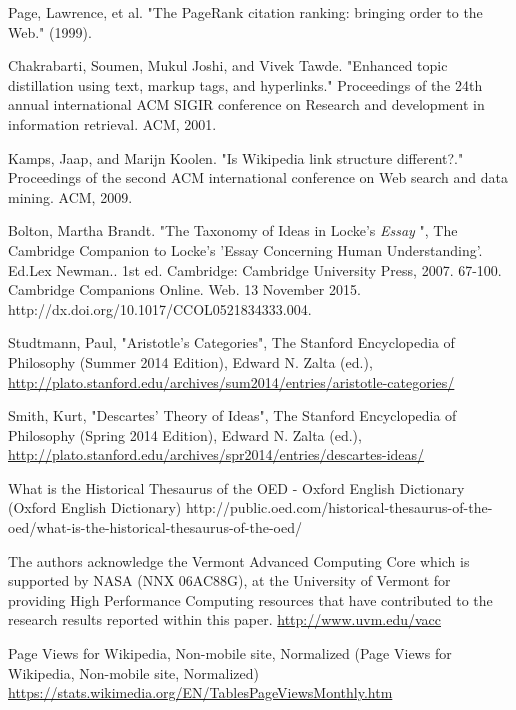 \documentclass[pre,twocolumn,twoside,superscriptaddress,floatfix, aps, 10pt]{revtex4-1}
\begin{document}
\begin{thebibliography}{1}
       Page, Lawrence, et al. "The PageRank citation ranking: bringing order to the Web." (1999).

       Chakrabarti, Soumen, Mukul Joshi, and Vivek Tawde. "Enhanced topic distillation using text, markup tags, and hyperlinks." Proceedings of the 24th annual international ACM SIGIR conference on Research and development in information retrieval. ACM, 2001.

       Kamps, Jaap, and Marijn Koolen. "Is Wikipedia link structure different?." Proceedings of the second ACM international conference on Web search and data mining. ACM, 2009.

     Bolton, Martha Brandt. "The Taxonomy of Ideas in Locke’s {\it Essay} ", The Cambridge Companion to Locke's 'Essay Concerning Human Understanding'. Ed.Lex Newman.. 1st ed. Cambridge: Cambridge University Press, 2007. 67-100. Cambridge Companions Online. Web. 13 November 2015. http://dx.doi.org/10.1017/CCOL0521834333.004.

     Studtmann, Paul, "Aristotle's Categories", The Stanford Encyclopedia of Philosophy (Summer 2014 Edition), Edward N. Zalta (ed.), \url{http://plato.stanford.edu/archives/sum2014/entries/aristotle-categories/}

     Smith, Kurt, "Descartes' Theory of Ideas", The Stanford Encyclopedia of Philosophy (Spring 2014 Edition), Edward N. Zalta (ed.), \url{http://plato.stanford.edu/archives/spr2014/entries/descartes-ideas/}


     What is the Historical Thesaurus of the OED - Oxford English Dictionary (Oxford English Dictionary)
    http://public.oed.com/historical-thesaurus-of-the-oed/what-is-the-historical-thesaurus-of-the-oed/

     The authors acknowledge the Vermont Advanced Computing Core which is supported by NASA (NNX 06AC88G), at the University of Vermont for providing High Performance Computing resources that have contributed to the research results reported within this paper.
    \url{http://www.uvm.edu/vacc}

     Page Views for Wikipedia, Non-mobile site, Normalized (Page Views for Wikipedia, Non-mobile site, Normalized)
    \url{https://stats.wikimedia.org/EN/TablesPageViewsMonthly.htm}
\end{thebibliography}
\end{document}
